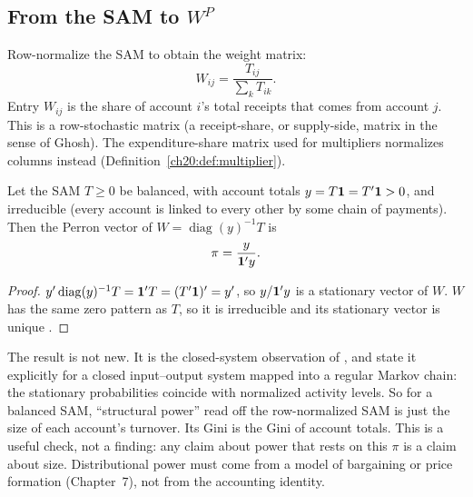 \documentclass[../structural_economics_book.tex]{subfiles}
\begin{document}
\subsection{From the SAM to $W^P$}

\begin{definition}\label{ch20:def:sam_to_W}
Row-normalize the SAM to obtain the weight matrix:
\begin{equation}\label{ch20:eq:sam_to_W}
W_{ij} = \frac{T_{ij}}{\sum_k T_{ik}}.
\end{equation}
Entry $W_{ij}$ is the share of account $i$'s total receipts that comes from account $j$. This is a row-stochastic matrix (a receipt-share, or supply-side, matrix in the sense of Ghosh). The expenditure-share matrix used for multipliers normalizes columns instead (Definition~\ref{ch20:def:multiplier}).
\end{definition}

\begin{proposition}\label{ch20:prop:pi_size}
Let the SAM $T \ge 0$ be balanced, with account totals $y = T\mathbf{1} = T'\mathbf{1} > 0$, and irreducible (every account is linked to every other by some chain of payments). Then the Perron vector of $W = \operatorname{diag}(y)^{-1}T$ is
\[
\pi = \frac{y}{\mathbf{1}'y}.
\]
\end{proposition}

\begin{proof}
$y'\operatorname{diag}(y)^{-1}T = \mathbf{1}'T = (T'\mathbf{1})' = y'$, so $y/\mathbf{1}'y$ is a stationary vector of $W$. $W$ has the same zero pattern as $T$, so it is irreducible and its stationary vector is unique \citep[Thm.~1.5]{seneta2006nonnegative}.
\end{proof}

The result is not new. It is the closed-system observation of \citet{brody1970proportions}, and \citet*{wirkierman2021leontief} state it explicitly for a closed input--output system mapped into a regular Markov chain: the stationary probabilities coincide with normalized activity levels. So for a balanced SAM, ``structural power'' read off the row-normalized SAM is just the size of each account's turnover. Its Gini is the Gini of account totals. This is a useful check, not a finding: any claim about power that rests on this $\pi$ is a claim about size. Distributional power must come from a model of bargaining or price formation (Chapter~7), not from the accounting identity.
\end{document}
